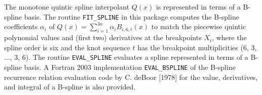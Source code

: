 
The monotone quintic spline interpolant $Q(x)$ is represented in terms of
a B-spline basis. The routine {\tt FIT\_SPLINE} in this package computes
the B-spline coefficients $\alpha_i$ of $Q(x)=\sum_{i=1}^{3n} \alpha_i
B_{i,6,t}(x)$ to match the piecewise quintic polynomial values and (first
two) derivatives at the breakpoints $X_i$, where the spline order is six
and the knot sequence $t$ has the breakpoint multiplicities (6, 3, $\ldots$,
3, 6).  The routine {\tt EVAL\_SPLINE} evaluates a spline represented in
terms of a B-spline basis. A Fortran 2003 implementation {\tt EVAL\_BSPLINE}
of the B-spline recurrence relation evaluation code by C. deBoor [1978]
for the value, derivatives, and integral of a B-spline is also provided.

%
%
%
%                                                                
%
%
%
%
